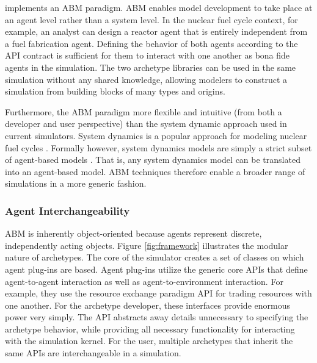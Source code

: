 \Cyclus implements an \acrlong{ABM} paradigm. \gls{ABM} enables model
development to take place at an agent level rather than a system level. In the
nuclear fuel cycle context, for example, an analyst can design a reactor agent
that is entirely independent from a fuel fabrication agent. Defining the
behavior of both agents according to the
\gls{API} contract is sufficient for them to interact with one another as
bona fide agents in the simulation.  The two archetype libraries can be used in
the same simulation without any shared knowledge, allowing modelers to
construct a simulation from building blocks of many types and origins.

Furthermore, the \gls{ABM} paradigm more flexible and intuitive (from both a developer and user perspective) than the system dynamic approach used in current simulators.
System dynamics is a popular approach for modeling nuclear fuel cycles
\cite{jacobson_vision_2009,van_den_durpel_daness_2009,guerin_impact_2009,guerin_benchmark_2009}.
Formally however, system dynamics models are simply a strict subset of agent-based models
\cite{macal_agent-based_2010}.
That is, any system dynamics model can be translated
into an agent-based model.
\gls{ABM} techniques therefore enable a broader range of simulations in a more
generic fashion.

\subsubsection{Agent Interchangeability}\label{sec:interchangeability}


\gls{ABM} is inherently object-oriented because agents represent discrete,
independently acting objects.  Figure \ref{fig:framework} illustrates the
modular nature of \Cyclus archetypes.  The core of the \Cyclus simulator creates
a set of classes on which agent plug-ins are based.  Agent plug-ins utilize the
generic core \glspl{API} that define agent-to-agent interaction as well as agent-to-environment interaction.
For example, they use the
resource exchange paradigm \gls{API} for trading resources with one another.  
For the archetype developer, these interfaces provide enormous power
very simply. The \gls{API} abstracts away details unnecessary to specifying the 
archetype behavior, while providing
all necessary functionality for interacting with the \Cyclus simulation kernel.
For the user, multiple archetypes that inherit the same \glspl{API} are interchangeable
in a simulation.

